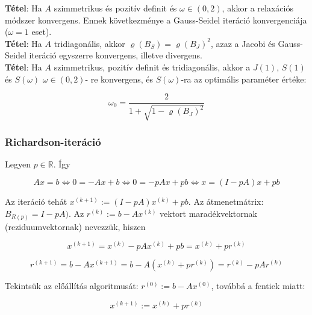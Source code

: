 \documentclass[margin=0px]{article}
\begin{document}
\noindent \textbf{Tétel}: Ha $A$ szimmetrikus és pozitív definit és $\omega \in (0, 2)$, akkor a relaxációs módszer konvergens. Ennek
következménye a Gauss-Seidel iteráció konvergenciája ($\omega = 1$ eset).\\

\noindent \textbf{Tétel}: Ha $A$ tridiagonális, akkor $\varrho(B_{S}) = \varrho(B_{J})^{2}$, azaz a Jacobi és Gauss-Seidel iteráció
egyszerre konvergens, illetve divergens.\\

\noindent \textbf{Tétel}: Ha $A$ szimmetrikus, pozitív definit és tridiagonális, akkor a $J(1)$, $S(1)$ és $S(\omega)$ $\omega \in (0, 2)$-
re konvergens, és $S(\omega)$-ra az optimális paraméter értéke:

\begin{displaymath}
    \omega_{0} = \frac{2}{1 + \sqrt{1 - \varrho(B_{J})^{2}}}
\end{displaymath}

\subsubsection{Richardson-iteráció}

Legyen $p \in \mathbb{R}$. Így

\begin{displaymath}
    Ax = b \Longleftrightarrow
    0 = -Ax + b \Longleftrightarrow
    0 = -pAx + pb \Longleftrightarrow
    x = (I-pA)x +pb
\end{displaymath}

Az iteráció tehát $x^{(k+1)} := (I-pA)x^{(k)} +pb$. Az átmenetmátrix: $B_{R(p)} = I-pA)$. Az
$r^{(k)} := b - Ax^{(k)} $ vektort maradékvektornak (reziduumvektornak) nevezzük, hiszen

\begin{displaymath}
    x^{(k+1)} = x^{(k)} - pAx^{(k)} + pb = x^{(k)} + pr^{(k)}
\end{displaymath}

\begin{displaymath}
    r^{(k+1)} = b - Ax^{(k+1)} = b - A(x^{(k)} + pr^{(k)}) = r^{(k)} - pAr^{(k)}
\end{displaymath}

\noindent Tekintsük az előállítás algoritmusát: $r^{(0)} := b - Ax^{(0)}$, továbbá a fentiek miatt:

\begin{displaymath}
    x^{(k+1)} := x^{(k)} + pr^{(k)}
\end{displaymath}
\end{document}
